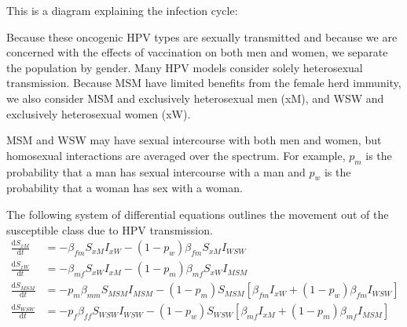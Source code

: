 \documentclass[12pt]{article}
\newcommand{\D}[2]{\frac{\mathrm{d}#1}{\mathrm{d}#2}}
\begin{document}
This is a diagram explaining the infection cycle:
\begin{figure}[h!]
\begin{center}
\end{center}
\end{figure}

Because these oncogenic HPV types are sexually transmitted and because we are concerned with the effects of vaccination on both men and women, we separate the population by gender.  Many HPV models consider solely heterosexual transmission.  Because MSM have limited benefits from the female herd immunity, we also consider MSM and exclusively heterosexual men (xM), and WSW and exclusively heterosexual women (xW).  

MSM and WSW may have sexual intercourse with both men and women, but homosexual interactions are averaged over the spectrum.  For example, $p_m$ is the probability that a man has sexual intercourse with a man and $p_w$ is the probability that a woman has sex with a woman.  

The following system of differential equations outlines the movement out of the susceptible class due to HPV transmission. 
\begin{align}
\D{S_{xM}}{t} & = - \beta_{fm}S_{xM}I_{xW} - (1-p_w)\beta_{fm}S_{xM}I_{WSW}\\
\D{S_{xW}}{t} & = - \beta_{mf}S_{xW}I_{xM} - (1-p_m)\beta_{mf}S_{xW}I_{MSM}\\
\D{S_{MSM}}{t} & = -p_m\beta_{mm}S_{MSM}I_{MSM} - (1-p_m)S_{MSM}[\beta_{fm}I_{xW} + (1-p_w)\beta_{fm}I_{WSW}]\\
\D{S_{WSW}}{t} & = -p_f\beta_{ff}S_{WSW}I_{WSW} - (1-p_w)S_{WSW}[\beta_{mf}I_{xM} + (1-p_m)\beta_{mf}I_{MSM}]
\end{align}
\end{document}
